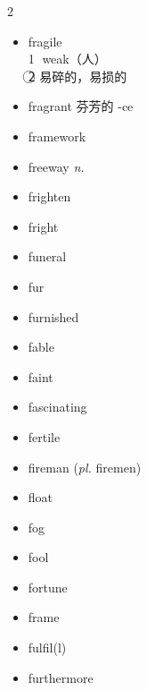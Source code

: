 \documentclass[../../book.tex]{subfiles}
\begin{document}
\begin{multicols}{2}
\begin{itemize}
\item[-] fragile
\\\textcircled{1} weak（人）
\\\textcircled{2} 易碎的，易损的
\item[-] fragrant 芬芳的 \phantom{a} -ce
\item[-] framework
\item[-] freeway \emph{n.}
\item[-] frighten
\item[-] fright
\item[-] funeral
\item[-] fur
\item[-] furnished
\item[-] fable
\item[-] faint
\item[-] fascinating
\item[-] fertile
\item[-] fireman (\emph{pl.} firemen)
\item[-] float
\item[-] fog
\item[-] fool
\item[-] fortune
\item[-] frame
\item[-] fulfil(l)
\item[-] furthermore
\end{itemize}
\end{multicols}
\end{document}
